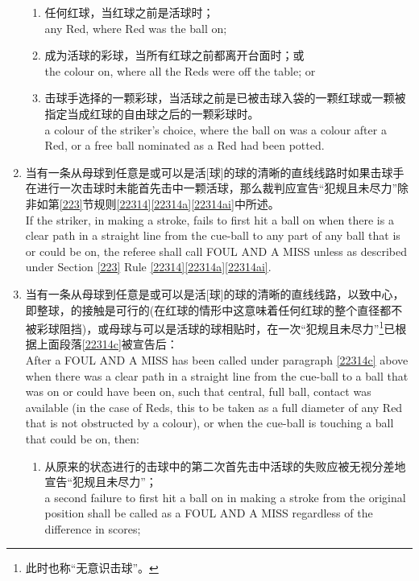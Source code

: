 \begin{enumerate}[label=(\alph*)]
    \begin{enumerate}[label=(\roman*)]
        \item 任何红球，当红球之前是活球时；\\
        any Red, where Red was the ball on;
        \item 成为活球的彩球，当所有红球之前都离开台面时；或\\
        the colour on, where all the Reds were off the table; or
        \item 击球手选择的一颗彩球，当活球之前是已被击球入袋的一颗红球或一颗被指定当成红球的自由球之后的一颗彩球时。\\
        a colour of the striker's choice, where the ball on was a colour after a Red, or a free ball nominated as a Red had been potted.
    \end{enumerate}
    \item \label{22314c}当有一条从母球到任意是或可以是活[球]的球的清晰的直线线路时如果击球手在进行一次击球时未能首先击中一颗活球，那么裁判应宣告``犯规且未尽力''除非如第\ref{223}节规则\ref{22314}\ref{22314a}\ref{22314ai}中所述。\\
    If the striker, in making a stroke, fails to first hit a ball on when there is a clear path in a straight line from the cue-ball to any part of any ball that is or could be on, the referee shall call FOUL AND A MISS unless as described under Section \ref{223} Rule \ref{22314}\ref{22314a}\ref{22314ai}.
    \item \label{22314d}当有一条从母球到任意是或可以是活[球]的球的清晰的直线线路，以致中心，即整球，的接触是可行的(在红球的情形中这意味着任何红球的整个直径都不被彩球阻挡)，或母球与可以是活球的球相贴时，在一次``犯规且未尽力''\footnote{此时也称``无意识击球''。}已根据上面段落\ref{22314c}被宣告后：\\
    After a FOUL AND A MISS has been called under paragraph \ref{22314c} above when there was a clear path in a straight line from the cue-ball to a ball that was on or could have been on, such that central, full ball, contact was available (in the case of Reds, this to be taken as a full diameter of any Red that is not obstructed by a colour), or when the cue-ball is touching a ball that could be on, then:
    \begin{enumerate}[label=(\roman*)]
        \item \label{22314di}从原来的状态进行的击球中的第二次首先击中活球的失败应被无视分差地宣告``犯规且未尽力''；\\
        a second failure to first hit a ball on in making a stroke from the original position shall be called as a FOUL AND A MISS regardless of the difference in scores;

\end{enumerate}
\end{enumerate}

